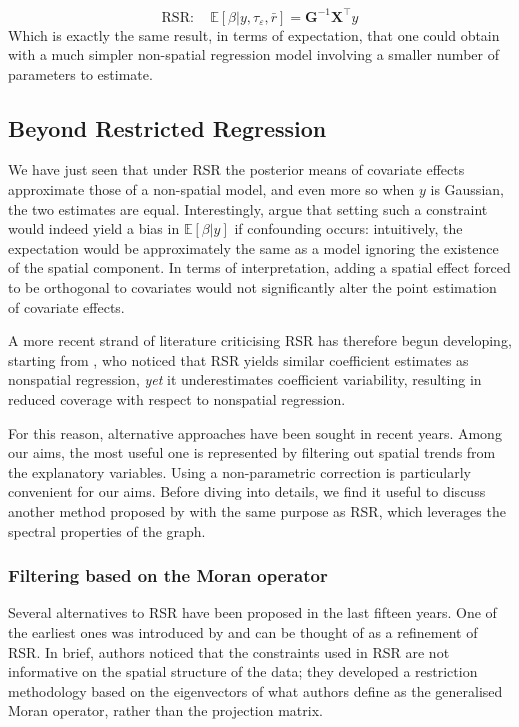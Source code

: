 \documentclass[openany, 11pt, oneside]{book}
\begin{document}
\begin{equation}
\mathrm{RSR}: \quad\mathbb{E}[\beta\vert y, \tau_{\varepsilon}, \bar{r}] = \boldsymbol{G}^{-1} \boldsymbol{X}^{\top}y
\label{eq:expbeta_RSR}
\end{equation}
Which is exactly the same result, in terms of expectation, that one could obtain with a much simpler non-spatial regression model involving a smaller number of parameters to estimate.

\subsection{Beyond Restricted Regression}

We have just seen that under RSR the posterior means of covariate effects approximate those of a non-spatial model, and even more so when $y$ is Gaussian, the two estimates are equal. Interestingly, \cite{DupontArXiv} argue that setting such a constraint would indeed yield a bias in $\mathbb{E}[\beta \vert y]$ if confounding occurs: intuitively, the expectation would be approximately the same as a model ignoring the existence of the spatial component. In terms of interpretation, adding a spatial effect forced to be orthogonal to covariates would not significantly alter the point estimation of covariate effects. 

A more recent strand of literature criticising RSR has therefore begun developing, starting from \cite{Khan}, who noticed that RSR yields similar coefficient estimates as nonspatial regression, \textit{yet} it underestimates coefficient variability, resulting in reduced coverage with respect to nonspatial regression. 

For this reason, alternative approaches have been sought in recent years. Among our aims, the most useful one is represented by filtering out spatial trends from the explanatory variables. Using a non-parametric correction \parencite{Urdangarin24} is particularly convenient for our aims. Before diving into details, we find it useful to discuss another method proposed by \cite{HughesHaran} with the same purpose as RSR, which leverages the spectral properties of the graph.



\subsubsection{Filtering based on the Moran operator}\label{par:I_moran}

Several alternatives to RSR have been proposed in the last fifteen years. One of the earliest ones was introduced by \cite{HughesHaran} and can be thought of as a refinement of RSR. In brief, authors noticed that the constraints used in RSR are not informative on the spatial structure of the data; they developed a restriction methodology based on the eigenvectors of what authors define as the generalised Moran operator, rather than the projection matrix.
\end{document}
